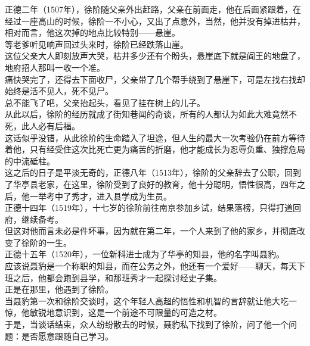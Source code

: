 \begin{multicols}{\theparacolNo}
正德二年（1507年），徐阶随父亲外出赶路，父亲在前面走，他在后面紧跟着，在经过一座高山的时候，徐阶一不小心，又出了点意外，当然，他并没有掉进枯井，相对而言，他这次掉的地点比较特别——悬崖。\\

等老爹听见响声回过头来时，徐阶已经跌落山崖。\\

这位父亲大人即刻放声大哭，枯井多少还有个盼头，悬崖底下就是阎王的地盘了，地府招人那叫一收一个准。\\

痛快哭完了，还得去下面收尸，父亲带了几个帮手绕到了悬崖下，可是左找右找却始终是活不见人，死不见尸。\\

总不能飞了吧，父亲抬起头，看见了挂在树上的儿子。\\

从此以后，徐阶的经历就成了街知巷闻的奇谈，所有的人都认为如此大难竟然不死，此人必有后福。\\

这话似乎没错，从此徐阶的生命踏入了坦途，但人生的最大一次考验仍在前方等待着他，只有经受住这次比死亡更为痛苦的折磨，他才能成长为忍辱负重、独撑危局的中流砥柱。\\

这之后的日子是平淡无奇的，正德八年（1513年），徐阶的父亲辞去了公职，回到了华亭县老家，在这里，徐阶受到了良好的教育，他十分聪明，悟性很高，四年之后，他一举考中了秀才，进入县学成为生员。\\

正德十四年（1519年），十七岁的徐阶前往南京参加乡试，结果落榜，只得打道回府，继续备考。\\

但这对他而言未必是件坏事，因为就在第二年，一个人来到了他的家乡，并彻底改变了徐阶的一生。\\

正德十五年（1520年），一位新科进士成为了华亭的知县，他的名字叫聂豹。\\

应该说聂豹是一个称职的知县，而在公务之外，他还有一个爱好——聊天，每天下班之后，他都会跑到县学，和那班秀才一起探讨经史子集。\\

正是在那里，他遇到了徐阶。\\

当聂豹第一次和徐阶交谈时，这个年轻人高超的悟性和机智的言辞就让他大吃一惊，他敏锐地意识到，这是一个前途不可限量的可造之材。\\

于是，当谈话结束，众人纷纷散去的时候，聂豹私下找到了徐阶，问了他一个问题：是否愿意跟随自己学习。\\


\end{multicols}
